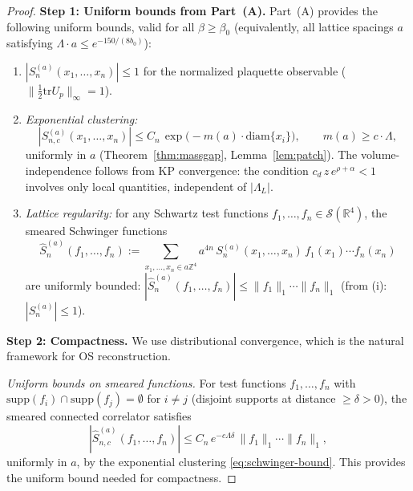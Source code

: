 \documentclass[11pt]{article}
\theoremstyle{definition}
\newcommand{\tr}{\mathrm{tr}}
\newcommand{\R}{\mathbb{R}}
\newcommand{\Z}{\mathbb{Z}}
\begin{document}
\begin{proof}
\textbf{Step 1: Uniform bounds from Part~(A).}
Part~(A) provides the following uniform bounds, valid for all
$\beta\ge\beta_0$ (equivalently, all lattice spacings $a$ satisfying
$\Lambda\cdot a\le e^{-150/(8b_0)}$):
\begin{enumerate}[nosep,label=(\roman*)]
\item $|S^{(a)}_n(x_1,\ldots,x_n)|\le 1$ for the normalized
plaquette observable ($\|\frac{1}{2}\tr U_p\|_\infty=1$).
\item \emph{Exponential clustering:}
\begin{equation}\label{eq:schwinger-bound}
|S^{(a)}_{n,c}(x_1,\ldots,x_n)|\le
C_n\,\exp\bigl(-m(a)\cdot\mathrm{diam}\{x_i\}\bigr),
\qquad m(a)\ge c\cdot\Lambda,
\end{equation}
uniformly in $a$ (Theorem~\ref{thm:massgap}, Lemma~\ref{lem:patch}).
The volume-independence follows from KP convergence:
the condition $c_d\,z\,e^{\rho+\alpha}<1$ involves only
local quantities, independent of $|\Lambda_L|$.
\item \emph{Lattice regularity:} for any Schwartz test functions
$f_1,\ldots,f_n\in\mathcal{S}(\R^4)$, the smeared Schwinger
functions
\begin{equation}\label{eq:smeared}
\hat S_n^{(a)}(f_1,\ldots,f_n)
:=\sum_{x_1,\ldots,x_n\in a\Z^4}a^{4n}\,
S_n^{(a)}(x_1,\ldots,x_n)\,f_1(x_1)\cdots f_n(x_n)
\end{equation}
are uniformly bounded:
$|\hat S_n^{(a)}(f_1,\ldots,f_n)|
\le\|f_1\|_1\cdots\|f_n\|_1$
(from (i): $|S_n^{(a)}|\le 1$).
\end{enumerate}

\textbf{Step 2: Compactness.}
We use distributional convergence, which is the natural
framework for OS reconstruction.

\emph{Uniform bounds on smeared functions.}
For test functions $f_1,\ldots,f_n$ with
$\mathrm{supp}(f_i)\cap\mathrm{supp}(f_j)=\emptyset$
for $i\ne j$ (disjoint supports at distance $\ge\delta>0$),
the smeared connected correlator satisfies
\begin{equation}\label{eq:equicont}
|\hat S_{n,c}^{(a)}(f_1,\ldots,f_n)|
\le C_n\,e^{-c\Lambda\delta}\,
\|f_1\|_1\cdots\|f_n\|_1,
\end{equation}
uniformly in $a$, by the exponential clustering
\eqref{eq:schwinger-bound}.  This provides
the uniform bound needed for compactness.


\end{proof}
\end{document}
